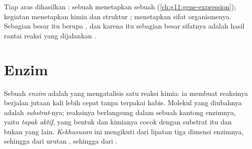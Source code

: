 \begin{proposition}\label{prop:g11:enzymes-and-phenotype:proteins}
Tiap aras  dihasilkan : sebuah  menetapkan sebuah
 (\cref{ch:g11:gene-expression}); kegiatan  menetapkan
kimia dan struktur ;  menetapkan sifat organismenya.
Sebagian besar  itu berupa \emph{}, dan karena itu sebagian
besar sifatnya adalah hasil rantai reaksi yang dijalankan .
\end{proposition}
\admitted

\section{Enzim}

\begin{definition}\label{def:g11:enzymes-and-phenotype:enzyme}
Sebuah \emph{enzim} adalah  yang mengatalisis satu
reaksi kimia: ia membuat reaksinya berjalan jutaan kali lebih cepat
tanpa terpakai habis. Molekul yang diubahnya adalah
\emph{substrat}-nya; reaksinya berlangsung dalam sebuah
kantong enzimnya, yaitu \emph{tapak aktif}, yang
bentuk dan kimianya cocok dengan substrat itu dan bukan yang lain.
\emph{Kekhususan} ini mengikuti dari lipatan tiga dimensi enzimnya,
sehingga dari urutan , sehingga dari .
\end{definition}

